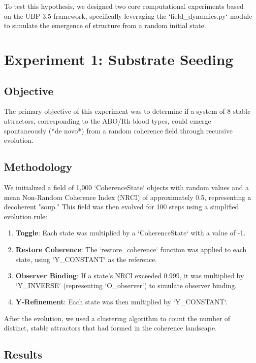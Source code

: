 \documentclass{article}
\begin{document}
To test this hypothesis, we designed two core computational experiments based on the UBP 3.5 framework, specifically leveraging the `field_dynamics.py` module to simulate the emergence of structure from a random initial state.

\section{Experiment 1: Substrate Seeding}

\subsection{Objective}

The primary objective of this experiment was to determine if a system of 8 stable attractors, corresponding to the ABO/Rh blood types, could emerge spontaneously (*de novo*) from a random coherence field through recursive evolution.

\subsection{Methodology}

We initialized a field of 1,000 `CoherenceState` objects with random values and a mean Non-Random Coherence Index (NRCI) of approximately 0.5, representing a decoherent "soup." This field was then evolved for 100 steps using a simplified evolution rule:

\begin{enumerate}
    \item \textbf{Toggle}: Each state was multiplied by a `CoherenceState` with a value of -1.
    \item \textbf{Restore Coherence}: The `restore_coherence` function was applied to each state, using `Y_CONSTANT` as the reference.
    \item \textbf{Observer Binding}: If a state's NRCI exceeded 0.999, it was multiplied by `Y_INVERSE` (representing `O_observer`) to simulate observer binding.
    \item \textbf{Y-Refinement}: Each state was then multiplied by `Y_CONSTANT`.
\end{enumerate}

After the evolution, we used a clustering algorithm to count the number of distinct, stable attractors that had formed in the coherence landscape.

\subsection{Results}
\end{document}
